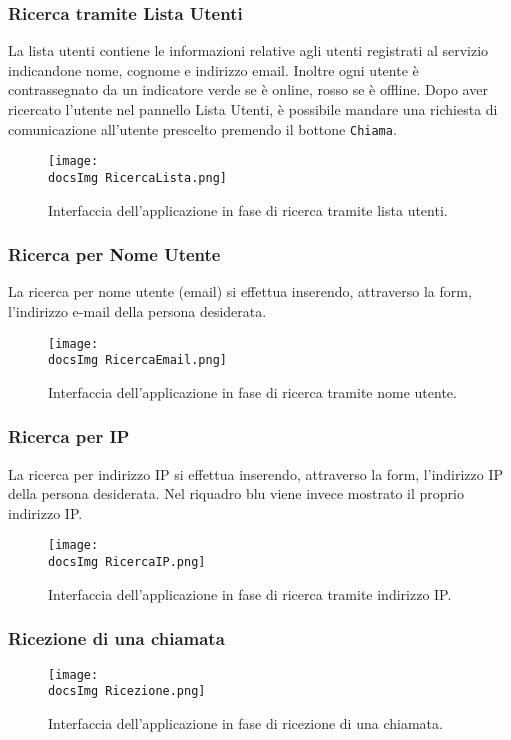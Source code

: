 {\subsubsection{Ricerca tramite Lista Utenti}{
La lista utenti contiene le informazioni relative agli utenti registrati al servizio indicandone nome, cognome e indirizzo email. Inoltre ogni utente è contrassegnato da un indicatore verde se è online, rosso se è offline.
Dopo aver ricercato l’utente nel pannello Lista Utenti, è possibile mandare una richiesta di comunicazione  all’utente prescelto premendo il bottone \texttt{Chiama}.
\begin{figure}[h!]
	\centering
		\texttt{[image: \\docsImg RicercaLista.png]}
		\caption{Interfaccia dell'applicazione in fase di ricerca tramite lista utenti.} 
		\label{fig:imgComLU}
	\end{figure}
	
\newpage

\subsubsection{Ricerca per Nome Utente}{
La ricerca per nome utente (email) si effettua inserendo, attraverso la form\g, l’indirizzo e-mail della persona desiderata.
\begin{figure}[h!]
	\centering
		\texttt{[image: \\docsImg RicercaEmail.png]}
		\caption{Interfaccia dell'applicazione in fase di ricerca tramite nome utente.} 
		\label{fig:imgComNU}
	\end{figure}

}

\newpage
\subsubsection{Ricerca per IP}{
La ricerca per indirizzo IP si effettua inserendo, attraverso la form\g, l’indirizzo IP della persona desiderata. Nel riquadro blu viene invece mostrato il proprio indirizzo IP.
\begin{figure}[h!]
	\centering
		\texttt{[image: \\docsImg RicercaIP.png]}
		\caption{Interfaccia dell'applicazione in fase di ricerca tramite indirizzo IP.} 
		\label{fig:imgComIP}
	\end{figure}
}

\newpage
\subsubsection{Ricezione di una chiamata}{
\begin{figure}[h!]
	\centering
		\texttt{[image: \\docsImg Ricezione.png]}
		\caption{Interfaccia dell'applicazione in fase di ricezione di una chiamata.} 
		\label{fig:imgComRic}
	\end{figure}

}}}
